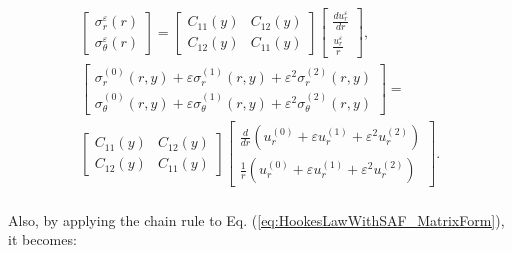 \begin{equation}\label{eq:HookesLawWithSAF_MatrixForm}
    \begin{aligned}
        \begin{bmatrix}
            \sigma_{r}^{\varepsilon}(r)\\
            \sigma_{\theta}^{\varepsilon}(r)
        \end{bmatrix} = 
        \begin{bmatrix}
            C_{11}(y) &  C_{12}(y) \\
            C_{12}(y)  & C_{11}(y) 
        \end{bmatrix}
        \begin{bmatrix}
            \frac{du_r^{\varepsilon}}{dr}\\
            \frac{u_r^{\varepsilon}}{r}
        \end{bmatrix}, \\
        \begin{bmatrix}
            \sigma_{r}^{(0)}(r,y) + \varepsilon\sigma_{r}^{(1)}(r,y) + \varepsilon^2\sigma_{r}^{(2)}(r,y)\\
            \sigma_{\theta}^{(0)}(r,y) + \varepsilon\sigma_{\theta}^{(1)}(r,y)+\varepsilon^2\sigma_{\theta}^{(2)}(r,y)
        \end{bmatrix}= \\ 
        \begin{bmatrix}
            C_{11}(y) &  C_{12}(y) \\
            C_{12}(y)  & C_{11}(y) 
        \end{bmatrix}
        \begin{bmatrix}
            \frac{d}{dr}(u_r^{(0)} + \varepsilon u_r^{(1)} + \varepsilon^2 u_r^{(2)})\\
            \frac{1}{r}(u_r^{(0)} + \varepsilon u_r^{(1)} + \varepsilon^2 u_r^{(2)})
        \end{bmatrix}. \\
    \end{aligned}
\end{equation}

Also, by applying the chain rule to Eq. (\ref{eq:HookesLawWithSAF_MatrixForm}), it becomes:

